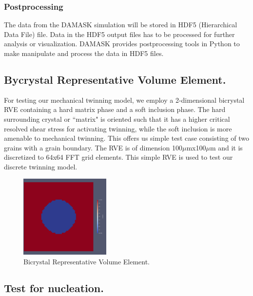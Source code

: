 \subsubsection{Postprocessing}
The data from the DAMASK simulation will be stored in HDF5 (Hierarchical Data File) file.  Data in the HDF5 output files has to be processed for further analysis or visualization. DAMASK provides postprocessing tools in Python to make manipulate and process the data in HDF5 files.



\subsection{Bycrystal Representative Volume Element.}

For testing our mechanical twinning model, we employ a 2-dimensional bicrystal RVE containing a hard matrix phase and a soft inclusion phase. The hard surrounding crystal or ``matrix" is oriented such that it has a higher critical resolved shear stress for activating twinning, while the soft inclusion is more amenable to mechanical twinning. This offers us simple test case consisting of two grains with a grain boundary. The RVE is of dimension 100$\mu$mx100$\mu$m and it is discretized to 64x64 FFT grid elements. This simple RVE is used to test our discrete twinning model.

\begin{figure}[H]
    \centering
    \includegraphics[width=0.4\textwidth]{images/Bycrystal_RVE.png}
    \caption{Bicrystal Representative Volume Element.}
    \label{fig:Bycrystal RVE.}
\end{figure}




\subsection{Test for nucleation.}

